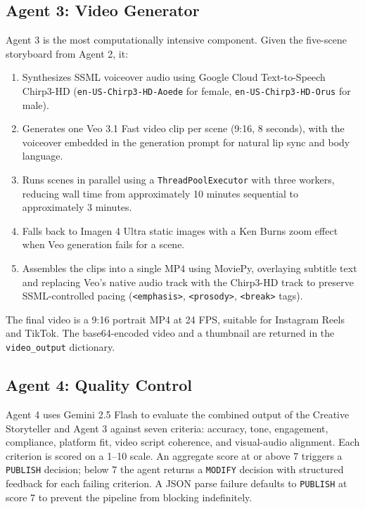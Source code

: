 \documentclass[12pt, letterpaper]{article}
\begin{document}
\subsection{Agent 3: Video Generator}

Agent 3 is the most computationally intensive component. Given the five-scene storyboard
from Agent 2, it:

\begin{enumerate}[leftmargin=1.5em]
  \item Synthesizes SSML voiceover audio using Google Cloud Text-to-Speech Chirp3-HD
    (\texttt{en-US-Chirp3-HD-Aoede} for female, \texttt{en-US-Chirp3-HD-Orus} for male).
  \item Generates one Veo 3.1 Fast video clip per scene (9:16, 8 seconds), with the
    voiceover embedded in the generation prompt for natural lip sync and body language.
  \item Runs scenes in parallel using a \texttt{ThreadPoolExecutor} with three workers,
    reducing wall time from approximately 10 minutes sequential to approximately 3 minutes.
  \item Falls back to Imagen 4 Ultra static images with a Ken Burns zoom effect when
    Veo generation fails for a scene.
  \item Assembles the clips into a single MP4 using MoviePy, overlaying subtitle text
    and replacing Veo's native audio track with the Chirp3-HD track to preserve
    SSML-controlled pacing (\texttt{<emphasis>}, \texttt{<prosody>}, \texttt{<break>} tags).
\end{enumerate}

The final video is a 9:16 portrait MP4 at 24 FPS, suitable for Instagram Reels and
TikTok. The base64-encoded video and a thumbnail are returned in the
\texttt{video\_output} dictionary.

\subsection{Agent 4: Quality Control}

Agent 4 uses Gemini 2.5 Flash to evaluate the combined output of the Creative
Storyteller and Agent 3 against seven criteria: accuracy, tone, engagement, compliance,
platform fit, video script coherence, and visual-audio alignment. Each criterion is
scored on a 1--10 scale. An aggregate score at or above 7 triggers a \texttt{PUBLISH}
decision; below 7 the agent returns a \texttt{MODIFY} decision with structured feedback
for each failing criterion. A JSON parse failure defaults to \texttt{PUBLISH} at score
7 to prevent the pipeline from blocking indefinitely.
\end{document}
